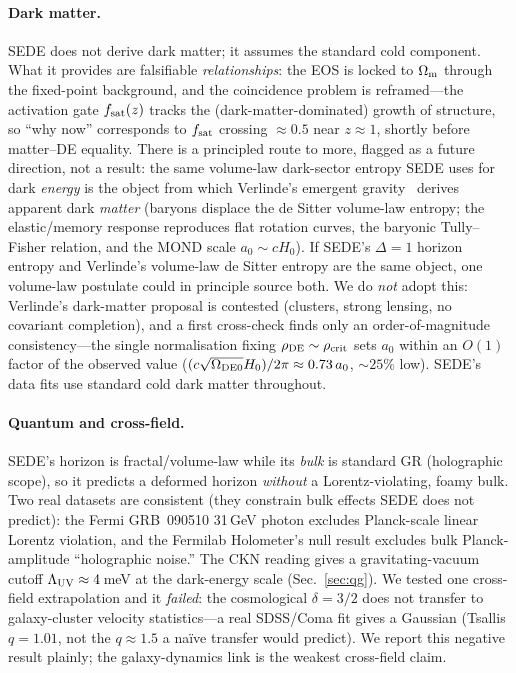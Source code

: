 \paragraph{Dark matter.} SEDE does not derive dark matter; it assumes the standard cold component. What
it provides are falsifiable \emph{relationships}: the EOS is locked to $\Omega_{\mathrm m}$ through the fixed-point
background, and the coincidence problem is reframed---the activation gate $f_{\mathrm{sat}}(z)$ tracks the
(dark-matter-dominated) growth of structure, so ``why now'' corresponds to $f_{\mathrm{sat}}$ crossing $\approx0.5$
near $z\approx1$, shortly before matter--DE equality. There is a principled route to more, flagged as a
future direction, not a result: the same volume-law dark-sector entropy SEDE uses for dark \emph{energy}
is the object from which Verlinde's emergent gravity~\cite{Verlinde:2016toy} derives apparent dark
\emph{matter} (baryons displace the de Sitter volume-law entropy; the elastic/memory response reproduces
flat rotation curves, the baryonic Tully--Fisher relation, and the MOND scale $a_0\sim cH_0$). If SEDE's
$\Delta=1$ horizon entropy and Verlinde's volume-law de Sitter entropy are the same object, one
volume-law postulate could in principle source both. We do \emph{not} adopt this: Verlinde's
dark-matter proposal is contested (clusters, strong lensing, no covariant completion), and a first
cross-check finds only an order-of-magnitude consistency---the single normalisation fixing
$\rho_{\mathrm{DE}}\sim\rho_{\mathrm{crit}}$ sets $a_0$ within an $O(1)$ factor of the observed value
($(c\sqrt{\Omega_{\mathrm{DE0}}}H_0)/2\pi\approx0.73\,a_0$, $\sim25\%$ low). SEDE's data fits use standard cold dark
matter throughout.

\paragraph{Quantum and cross-field.} SEDE's horizon is fractal/volume-law while its \emph{bulk} is
standard GR (holographic scope), so it predicts a deformed horizon \emph{without} a Lorentz-violating,
foamy bulk. Two real datasets are consistent (they constrain bulk effects SEDE does not predict): the
Fermi GRB~090510 31\,GeV photon excludes Planck-scale linear Lorentz violation, and the Fermilab
Holometer's null result excludes bulk Planck-amplitude ``holographic noise.'' The CKN reading gives a
gravitating-vacuum cutoff $\Lambda_{\rm UV}\approx4$\,meV at the dark-energy scale (Sec.~\ref{sec:qg}).
We tested one cross-field extrapolation and it \emph{failed}: the cosmological $\delta=3/2$ does not
transfer to galaxy-cluster velocity statistics---a real SDSS/Coma fit gives a Gaussian (Tsallis
$q=1.01$, not the $q\approx1.5$ a naïve transfer would predict). We report this negative result
plainly; the galaxy-dynamics link is the weakest cross-field claim.

